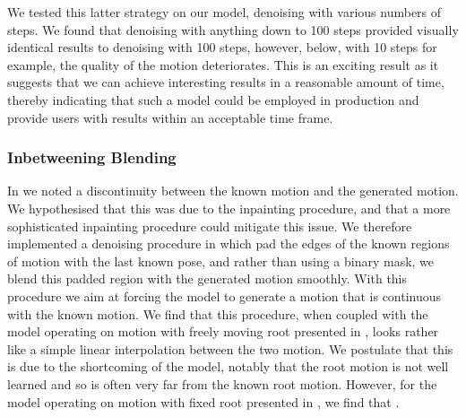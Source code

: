 We tested this latter strategy on our model, denoising with various numbers of steps. We found that denoising with anything down to 100 steps provided visually identical results to denoising with 100 steps, however, below, with 10 steps for example, the quality of the motion deteriorates. This is an exciting result as it suggests that we can achieve interesting results in a reasonable amount of time, thereby indicating that such a model could be employed in production and provide users with results within an acceptable time frame.

\subsubsection{Inbetweening Blending}
\label{sec:diffusion_inbetweening_blending}

In  we noted a discontinuity between the known motion and the generated motion. We hypothesised that this was due to the inpainting procedure, and that a more sophisticated inpainting procedure could mitigate this issue. We therefore implemented a denoising procedure in which pad the edges of the known regions of motion with the last known pose, and rather than using a binary mask, we blend this padded region with the generated motion smoothly. With this procedure we aim at forcing the model to generate a motion that is continuous with the known motion. We find that this procedure, when coupled with the model operating on motion with freely moving root presented in , looks rather like a simple linear interpolation between the two motion. We postulate that this is due to the shortcoming of the model, notably that the root motion is not well learned and so is often very far from the known root motion. However, for the model operating on motion with fixed root presented in , we find that .